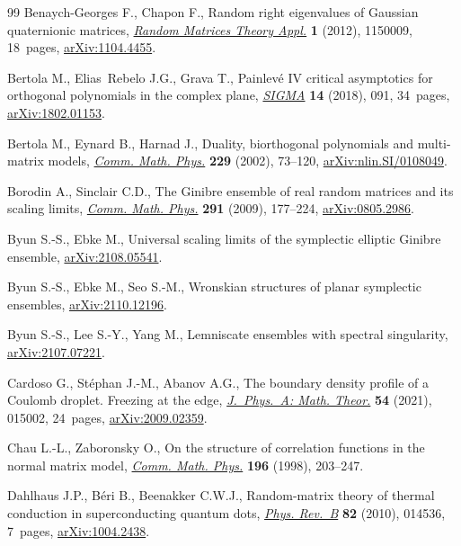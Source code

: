 \documentclass[pdftex]{sigma}
\numberwithin{equation}{section}
\newcommand{\1}{\chi}
\begin{document}
\begin{thebibliography}{99}
Benaych-Georges F., Chapon F., Random right eigenvalues of {G}aussian
 quaternionic matrices, \href{https://doi.org/10.1142/S2010326311500092}{\textit{Random Matrices Theory Appl.}} \textbf{1}
 (2012), 1150009, 18~pages, \href{https://arxiv.org/abs/1104.4455}{arXiv:1104.4455}.

Bertola M., Elias~Rebelo J.G., Grava T., Painlev\'e {IV} critical asymptotics
 for orthogonal polynomials in the complex plane, \href{https://doi.org/10.3842/SIGMA.2018.091}{\textit{SIGMA}} \textbf{14}
 (2018), 091, 34~pages, \href{https://arxiv.org/abs/1802.01153}{arXiv:1802.01153}.

Bertola M., Eynard B., Harnad J., Duality, biorthogonal polynomials and
 multi-matrix models, \href{https://doi.org/10.1007/s002200200663}{\textit{Comm. Math. Phys.}} \textbf{229} (2002), 73--120,
 \href{https://arxiv.org/abs/nlin.SI/0108049}{arXiv:nlin.SI/0108049}.

Borodin A., Sinclair C.D., The {G}inibre ensemble of real random matrices and
 its scaling limits, \href{https://doi.org/10.1007/s00220-009-0874-5}{\textit{Comm. Math. Phys.}} \textbf{291} (2009), 177--224,
 \href{https://arxiv.org/abs/0805.2986}{arXiv:0805.2986}.

Byun S.-S., Ebke M., Universal scaling limits of the symplectic elliptic
 {G}inibre ensemble, \href{https://arxiv.org/abs/2108.05541}{arXiv:2108.05541}.

Byun S.-S., Ebke M., Seo S.-M., Wronskian structures of planar symplectic
 ensembles, \href{https://arxiv.org/abs/2110.12196}{arXiv:2110.12196}.

Byun S.-S., Lee S.-Y., Yang M., Lemniscate ensembles with spectral singularity,
 \href{https://arxiv.org/abs/2107.07221}{arXiv:2107.07221}.

Cardoso G., St\'ephan J.-M., Abanov A.G., The boundary density profile of a
 {C}oulomb droplet. {F}reezing at the edge, \href{https://doi.org/10.1088/1751-8121/abcab9}{\textit{J.~Phys.~A: Math. Theor.}}
 \textbf{54} (2021), 015002, 24~pages, \href{https://arxiv.org/abs/2009.02359}{arXiv:2009.02359}.

Chau L.-L., Zaboronsky O., On the structure of correlation functions in the
 normal matrix model, \href{https://doi.org/10.1007/s002200050420}{\textit{Comm. Math. Phys.}} \textbf{196} (1998),
 203--247.

Dahlhaus J.P., B\'eri B., Beenakker C.W.J., Random-matrix theory of thermal
 conduction in superconducting quantum dots, \href{https://doi.org/10.1103/PhysRevB.82.014536}{\textit{Phys. Rev.~B}} \textbf{82}
 (2010), 014536, 7~pages, \href{https://arxiv.org/abs/1004.2438}{arXiv:1004.2438}.


\end{thebibliography}
\end{document}
